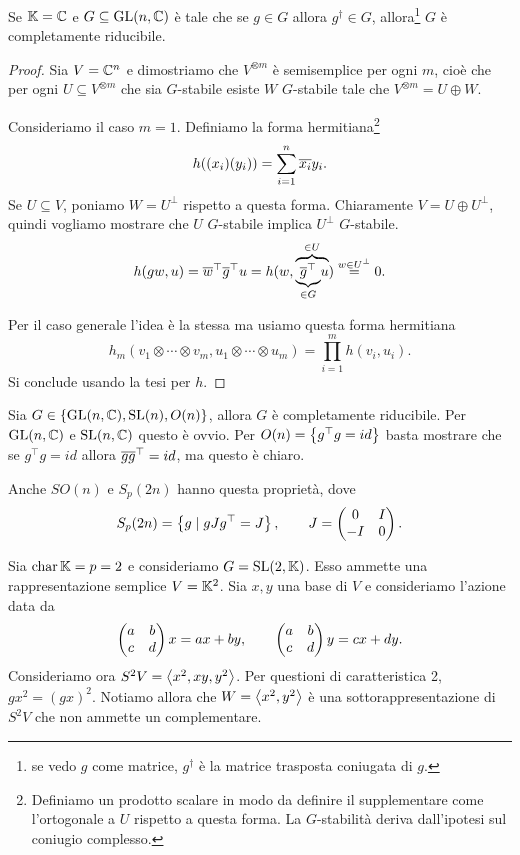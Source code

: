 \begin{corollary}
    Se $\K=\C$ e $G\subseteq \GL(n,\C)$ \`e tale che se $g\in G$ allora $g^\dagger\in G$, allora\footnote{se vedo $g$ come matrice, $g^\dagger$ \`e la matrice trasposta coniugata di $g$.} $G$ \`e completamente riducibile.
\end{corollary}
\begin{proof}
Sia $V=\C^n$ e dimostriamo che $V^{\otimes m}$ \`e semisemplice per ogni $m$, cio\`e che per ogni $U\subseteq V^{\otimes m}$ che sia $G$-stabile esiste $W$ $G$-stabile tale che $V^{\otimes m}=U\oplus W$.

Consideriamo il caso $m=1$. Definiamo la forma hermitiana\footnote{Definiamo un prodotto scalare in modo da definire il supplementare come l'ortogonale a $U$ rispetto a questa forma. La $G$-stabilit\`a deriva dall'ipotesi sul coniugio complesso.}
\[h((x_i)(y_i))=\sum_{i=1}^n \ol{x_i}y_i.\]
Se $U\subseteq V$, poniamo $W=U^\perp$ rispetto a questa forma. Chiaramente $V=U\oplus U^\perp$, quindi vogliamo mostrare che $U$ $G$-stabile implica $U^\perp$ $G$-stabile.
\[h(gw,u)=\ol w^\top \ol g^\top u=h(w,\overset{\in U}{\overbrace{\under{\in G}{\ol g^\top}u}})\pasgnlmath={w\in U^\perp}0.\]


Per il caso generale l'idea \`e la stessa ma usiamo questa forma hermitiana
\[h_m(v_1\otimes\cdots\otimes v_m,u_1\otimes \cdots\otimes u_m)=\prod_{i=1}^m h(v_i,u_i).\]
Si conclude usando la tesi per $h$.
\end{proof}

\begin{example}
Sia $G\in\cpa{\GL(n,\C), \SL(n), O(n)}$, allora $G$ \`e completamente riducibile. Per $\GL(n,\C)$ e $\SL(n,\C)$ questo \`e ovvio. Per $O(n)=\cpa{g^\top g=id}$ basta mostrare che se $g^\top g=id$ allora $\ol g \ol g^\top=id$, ma questo \`e chiaro.


Anche $SO(n)$ e $S_p(2n)$ hanno questa propriet\`a, dove
\[S_p(2n)=\cpa{g\mid gJg^\top=J},\qquad J=\mat{0 &I\\ -I &0}.\]
\end{example}



\begin{example}
Sia $\cha \K=p=2$ e consideriamo $G=\SL(2,\K)$. Esso ammette una rappresentazione semplice $V=\K^2$. Sia $x,y$ una base di $V$ e consideriamo l'azione data da
\[\mat{a&b\\c&d}x=ax+by,\qquad \mat{a&b\\c&d}y=cx+dy.\]
Consideriamo ora $S^2V=\ps{x^2,xy,y^2}$. Per questioni di caratteristica 2, $gx^2=(gx)^2$. Notiamo allora che $W=\ps{x^2,y^2}$ \`e una sottorappresentazione di $S^2V$ che non ammette un complementare.
\end{example}

